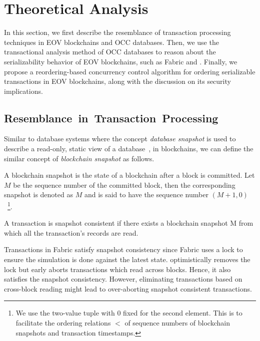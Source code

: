 \section{Theoretical Analysis}
\label{ch:txn:theory}

In this section, we first describe the resemblance of transaction processing
techniques in EOV blockchains and OCC databases.
%
Then, we use the transactional analysis method of OCC databases to
reason about the serializability behavior of EOV blockchains, such as Fabric and {\fabricPlusplus}.
%
Finally, we propose a reordering-based concurrency control algorithm for ordering
serializable transactions in EOV blockchains, 
along with the discussion on its security implications.

\subsection{Resemblance~in~Transaction~Processing}
\label{ch:txn:resembalance}
%
Similar to database systems where the concept \textit{database snapshot} is used
to describe a read-only, static view of a database~\cite{kung1981optimistic}, in blockchains, we can define the similar concept of \textit{blockchain snapshot} as follows.

\begin{definition}
  \label{defn:snapshot}
  A blockchain snapshot is the state of a blockchain after a block is committed.
  Let $M$ be the sequence number of the committed block, then the
  corresponding snapshot is denoted as $M$ and is said to have the sequence
  number $(M{+}1,0)$~\footnote{We use the two-value tuple with 0 fixed for the
    second element. This is to facilitate the ordering relations $<$ of sequence numbers of blockchain snapshots and
    transaction timestamps.}.
\end{definition}

\begin{definition}
  \label{defn:inconsistentExe}
  A transaction is snapshot consistent if there exists a blockchain snapshot M
  from which all the transaction's records are read.
\end{definition}

Transactions in Fabric satisfy snapshot consistency since Fabric uses a lock to
ensure the simulation is done against the latest state.
%
{\fabricPlusplus} optimistically removes the lock but early aborts transactions which read across blocks.
%
Hence, it also satisfies the snapshot consistency. 
%
However, eliminating transactions based on cross-block reading might
lead to over-aborting snapshot consistent transactions.

